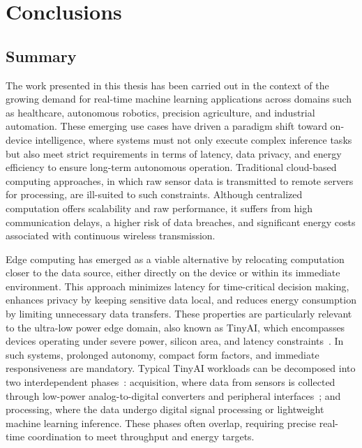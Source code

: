 \chapter{Conclusions}

    \section{Summary}
    
        The work presented in this thesis has been carried out in the context of the growing demand for real-time machine learning applications across domains such as healthcare, autonomous robotics, precision agriculture, and industrial automation. These emerging use cases have driven a paradigm shift toward on-device intelligence, where systems must not only execute complex inference tasks but also meet strict requirements in terms of latency, data privacy, and energy efficiency to ensure long-term autonomous operation. Traditional cloud-based computing approaches, in which raw sensor data is transmitted to remote servers for processing, are ill-suited to such constraints. Although centralized computation offers scalability and raw performance, it suffers from high communication delays, a higher risk of data breaches, and significant energy costs associated with continuous wireless transmission.
        
        Edge computing has emerged as a viable alternative by relocating computation closer to the data source, either directly on the device or within its immediate environment. This approach minimizes latency for time-critical decision making, enhances privacy by keeping sensitive data local, and reduces energy consumption by limiting unnecessary data transfers. These properties are particularly relevant to the ultra-low power edge domain, also known as TinyAI, which encompasses devices operating under severe power, silicon area, and latency constraints~\cite{co-design_vision}. In such systems, prolonged autonomy, compact form factors, and immediate responsiveness are mandatory. Typical TinyAI workloads can be decomposed into two interdependent phases~\cite{bio_apps}: acquisition, where data from sensors is collected through low-power analog-to-digital converters and peripheral interfaces~\cite{taji2024energy}; and processing, where the data undergo digital signal processing or lightweight machine learning inference. These phases often overlap, requiring precise real-time coordination to meet throughput and energy targets.
        
